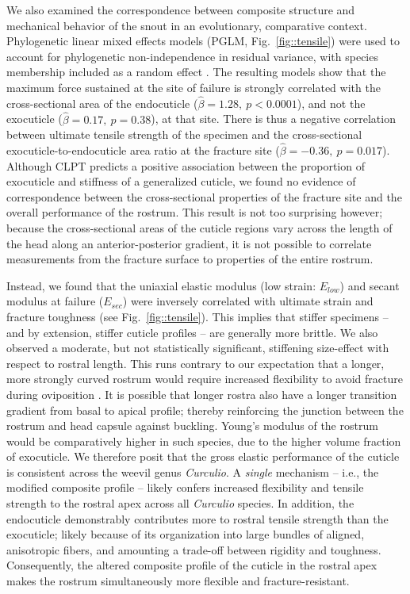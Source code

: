 \documentclass[twocolumn, linenumbers, superscriptaddress, nofootinbib]{revtex4-1}
\begin{document}
		We also examined the correspondence between composite structure and mechanical behavior of the snout in an evolutionary, comparative context.
		Phylogenetic linear mixed effects models (PGLM, Fig.~\ref{fig::tensile}) were used to account for phylogenetic non-independence in residual variance, with species membership included as a random effect \cite{Revell2010, Felsenstein1985}.
		The resulting models show that the maximum force sustained at the site of failure is strongly correlated with the cross-sectional area of the endocuticle ($\hat{\beta}=1.28,~p<0.0001$), and not the exocuticle ($\hat{\beta}=0.17,~p=0.38$), at that site.
		There is thus a negative correlation between ultimate tensile strength of the specimen and the cross-sectional exocuticle-to-endocuticle area ratio at the fracture site ($\hat{\beta}=-0.36,~p=0.017$).
		Although CLPT predicts a positive association between the proportion of exocuticle and stiffness of a generalized cuticle, we found no evidence of correspondence between the cross-sectional properties of the fracture site and the overall performance of the rostrum.
		This result is not too surprising however; because the cross-sectional areas of the cuticle regions vary across the length of the head along an anterior-posterior gradient, it is not possible to correlate measurements from the fracture surface to properties of the entire rostrum.
		
		Instead, we found that the uniaxial elastic modulus (low strain: $E_{low}$) and secant modulus at failure ($E_{sec}$) were inversely correlated with ultimate strain and fracture toughness (see Fig.~\ref{fig::tensile}).
		This implies that stiffer specimens -- and by extension, stiffer cuticle profiles -- are generally more brittle.
		We also observed a moderate, but not statistically significant, stiffening size-effect with respect to rostral length.
		This runs contrary to our expectation that a longer, more strongly curved rostrum would require increased flexibility to avoid fracture during oviposition \cite{Hughes2004eco, Bonal2011}.
		It is possible that longer rostra also have a longer transition gradient from basal to apical profile; thereby reinforcing the junction between the rostrum and head capsule against buckling.
		Young's modulus of the rostrum would be comparatively higher in such species, due to the higher volume fraction of exocuticle.
		We therefore posit that the gross elastic performance of the cuticle is consistent across the weevil genus \textit{Curculio}.
		A \emph{single} mechanism -- i.e., the modified composite profile -- likely confers increased flexibility and tensile strength to the rostral apex across all \textit{Curculio} species.
		In addition, the endocuticle demonstrably contributes more to rostral tensile strength than the exocuticle; likely because of its organization into large bundles of aligned, anisotropic fibers, and amounting a trade-off between rigidity and toughness.
		Consequently, the altered composite profile of the cuticle in the rostral apex makes the rostrum simultaneously more flexible and fracture-resistant.
		
\end{document}
